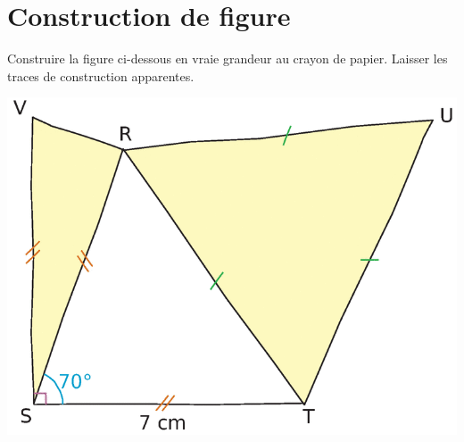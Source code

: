 \section{Construction de figure}

Construire la figure ci-dessous en vraie grandeur au crayon de papier.
Laisser les traces de construction apparentes.

\begin{center}
	\includegraphics[scale=0.4]{img/fig2}
\end{center}
